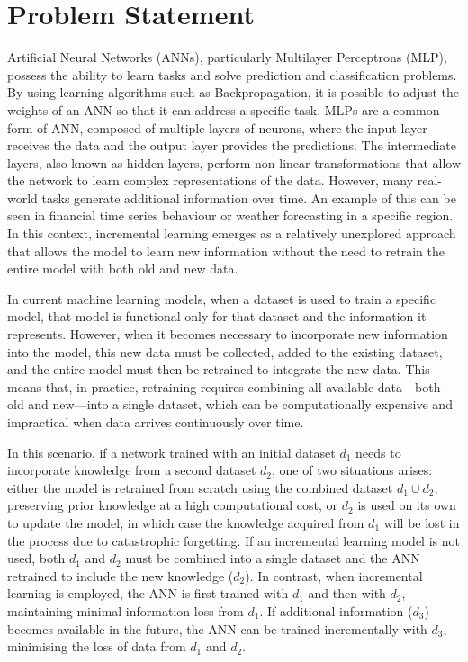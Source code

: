 \section{Problem Statement}

Artificial Neural Networks (ANNs), particularly Multilayer Perceptrons (MLP), possess the ability to learn tasks and solve prediction and classification problems. By using learning algorithms such as Backpropagation, it is possible to adjust the weights of an ANN so that it can address a specific task. MLPs are a common form of ANN, composed of multiple layers of neurons, where the input layer receives the data and the output layer provides the predictions. The intermediate layers, also known as hidden layers, perform non-linear transformations that allow the network to learn complex representations of the data. However, many real-world tasks generate additional information over time. An example of this can be seen in financial time series behaviour or weather forecasting in a specific region. In this context, incremental learning emerges as a relatively unexplored approach that allows the model to learn new information without the need to retrain the entire model with both old and new data.

In current machine learning models, when a dataset is used to train a specific model, that 
model is functional only for that dataset and the information it represents. However, when 
it becomes necessary to incorporate new information into the model, this new data must be 
collected, added to the existing dataset, and the entire model must then be retrained to 
integrate the new data. This means that, in practice, retraining requires combining all 
available data---both old and new---into a single dataset, which can be computationally 
expensive and impractical when data arrives continuously over time.

In this scenario, if a network trained with an initial dataset \(d_1\) needs to incorporate 
knowledge from a second dataset \(d_2\), one of two situations arises: either the model is 
retrained from scratch using the combined dataset \(d_1 \cup d_2\), preserving prior 
knowledge at a high computational cost, or \(d_2\) is used on its own to update the model, 
in which case the knowledge acquired from \(d_1\) will be lost in the process due to 
catastrophic forgetting. If an incremental learning model is not used, both \(d_1\) and 
\(d_2\) must be combined into a single dataset and the ANN retrained to include the new 
knowledge (\(d_2\)). In contrast, when incremental learning is employed, the ANN is first 
trained with \(d_1\) and then with \(d_2\), maintaining minimal information loss from 
\(d_1\). If additional information (\(d_3\)) becomes available in the future, the ANN can 
be trained incrementally with \(d_3\), minimising the loss of data from \(d_1\) and 
\(d_2\).\\

